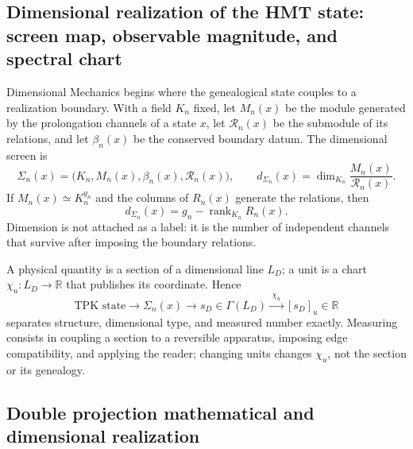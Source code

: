 {\subsection{Dimensional realization of the HMT state: screen map, observable magnitude, and spectral chart}

Dimensional Mechanics begins where the genealogical state couples to a
realization boundary. With a field \(K_n\) fixed, let \(M_n(x)\) be the module
generated by the prolongation channels of a state \(x\), let
\(\mathcal R_n(x)\) be the submodule of its relations, and let \(\beta_n(x)\) be the
conserved boundary datum. The dimensional screen is
\begin{equation}
\Sigma_n(x)=\bigl(K_n,M_n(x),\beta_n(x),\mathcal R_n(x)\bigr),
\qquad
d_{\Sigma_n}(x)=\dim_{K_n}\frac{M_n(x)}{\mathcal R_n(x)}.
\label{p12-83-c3-s1:eq:md-screen}
\end{equation}
If \(M_n(x)\simeq K_n^{g_n}\) and the columns of \(R_n(x)\) generate the
relations, then
\begin{equation}
\boxed{d_{\Sigma_n}(x)=g_n-\operatorname{rank}_{K_n}R_n(x).}
\label{p12-83-c3-s1:eq:md-rank}
\end{equation}
Dimension is not attached as a label: it is the number of independent
channels that survive after imposing the boundary relations.

A physical quantity is a section of a dimensional line \(L_D\); a unit is a chart \(\chi_u:L_D\to\mathbb R\) that publishes its coordinate. Hence
\begin{equation}
\text{TPK state}\longrightarrow\Sigma_n(x)
\longrightarrow s_D\in\Gamma(L_D)
\xrightarrow{\;\chi_u\;}[s_D]_u\in\mathbb R
\label{p12-83-c3-s1:eq:md-measurement-chain}
\end{equation}
separates structure, dimensional type, and measured number exactly. Measuring
consists in coupling a section to a reversible apparatus, imposing
edge compatibility, and applying the reader; changing units changes
\(\chi_u\), not the section or its genealogy.

\subsection{Double projection mathematical and dimensional realization}

}
